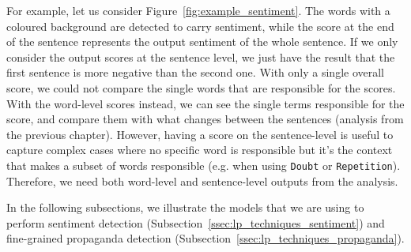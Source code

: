 For example, let us consider Figure~\ref{fig:example_sentiment}.
The words with a coloured background are detected to carry sentiment, while the score at the end of the sentence represents the output sentiment of the whole sentence.
If we only consider the output scores at the sentence level, we just have the result that the first sentence is more negative than the second one. With only a single overall score, we could not compare the single words that are responsible for the scores.
With the word-level scores instead, we can see the single terms responsible for the score, and compare them with what changes between the sentences (analysis from the previous chapter).
However, having a score on the sentence-level is useful to capture complex cases where no specific word is responsible but it's the context that makes a subset of words responsible (e.g. when using \texttt{Doubt} or \texttt{Repetition}).
Therefore, we need both word-level and sentence-level outputs from the analysis.

In the following subsections, we illustrate the models that we are using to perform sentiment detection (Subsection~\ref{ssec:lp_techniques_sentiment}) and fine-grained propaganda detection (Subsection~\ref{ssec:lp_techniques_propaganda}).


